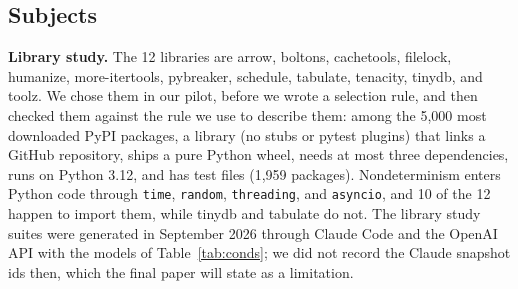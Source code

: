 \subsection{Subjects}
\textbf{Library study.} The 12 libraries are arrow, boltons, cachetools, filelock, humanize, more-itertools, pybreaker, schedule, tabulate, tenacity, tinydb, and toolz. We chose them in our pilot, before we wrote a selection rule, and then checked them against the rule we use to describe them: among the 5,000 most downloaded PyPI packages, a library (no stubs or pytest plugins) that links a GitHub repository, ships a pure Python wheel, needs at most three dependencies, runs on Python 3.12, and has test files (1,959 packages). Nondeterminism enters Python code through \texttt{time}, \texttt{random}, \texttt{threading}, and \texttt{asyncio}, and 10 of the 12 happen to import them, while tinydb and tabulate do not. The library study suites were generated in September 2026 through Claude Code and the OpenAI API with the models of Table~\ref{tab:conds}; we did not record the Claude snapshot ids then, which the final paper will state as a limitation.

